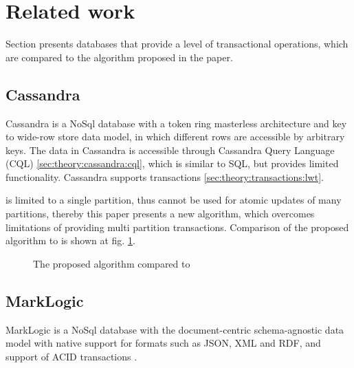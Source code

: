 \section{Related work}
Section presents databases that provide a level of transactional operations, which are compared to the algorithm proposed in the paper.

\subsection{Cassandra}
Cassandra is a NoSql database with a token ring masterless architecture and key to wide-row store data model, 
in which different rows are accessible by arbitrary keys. 
The data in Cassandra is accessible through Cassandra Query Language (CQL) \ref{sec:theory:cassandra:cql}, which is similar to SQL, but provides limited functionality. Cassandra supports \lwt transactions \ref{sec:theory:transactions:lwt}.

\lwt is limited to a single partition, thus \lwt cannot be used for atomic updates of many partitions, thereby this paper presents a new algorithm, which overcomes limitations of \lwt providing multi partition transactions.
Comparison of the proposed algorithm to \lwt is shown at fig. \ref{fig:mppVsLwt}.

\begin{figure}[hbt]
  \setlength{\unitlength}{1.3cm}  
  \caption{The proposed algorithm compared to \lwt}
  \label{fig:mppVsLwt}
\end{figure}

\subsection{MarkLogic}
MarkLogic is a NoSql database with the document-centric schema-agnostic data model \cite{markLogicDataModel} with native support for formats such as JSON, XML and RDF, and support of ACID transactions \cite{markLogicAcid}.

